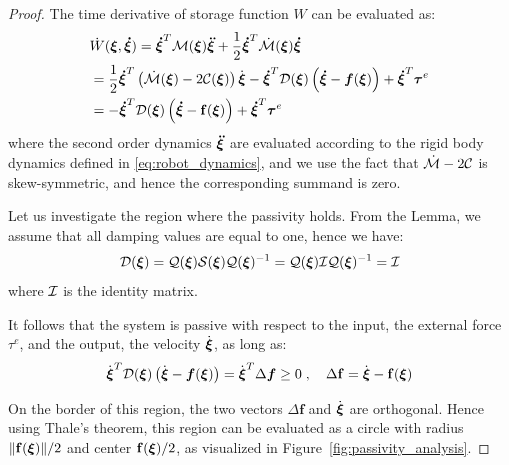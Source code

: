 \begin{proof}
The time derivative of storage function $W$ can be evaluated as:
\begin{align}
	& \dot W(\boldsymbol{\xi}, \boldsymbol{\dot \xi}) =
    \boldsymbol{\dot \xi}^T \mathcal{M}(\boldsymbol{\xi}) \boldsymbol{\ddot \xi}  + \frac{1}{2} \boldsymbol{\dot \xi}^T \dot{\mathcal{M}}(\boldsymbol{\xi}) \boldsymbol{\dot \xi}  \nonumber \\
  &= \frac{1}{2} \boldsymbol{\dot \xi}^T \left( \dot{\mathcal{M}}(\boldsymbol{\xi}) - 2 \mathcal{C}(\boldsymbol{\xi}) \right) \dot{\boldsymbol{\xi}} - \boldsymbol{\dot \xi}^T \mathcal{D}(\boldsymbol{\xi}) \left(\boldsymbol{\dot \xi} - \boldsymbol{f}(\boldsymbol{\xi}) \right) + \boldsymbol{\dot \xi}^T \boldsymbol{\tau}^e \nonumber \\
  &= - \boldsymbol{\dot \xi}^T \mathcal{D}(\boldsymbol{\xi}) \left( \boldsymbol{\dot\xi} - \mathbf{f}(\boldsymbol{\xi}) \right) + \boldsymbol{\dot\xi}^T \boldsymbol{\tau}^e
\end{align}
where the second order dynamics $\boldsymbol{\ddot \xi}$ are evaluated according to the rigid body dynamics defined in \eqref{eq:robot_dynamics}, and we use the fact that $\dot{\mathcal{M}} - 2 \mathcal{C}$ is skew-symmetric, and hence the corresponding summand is zero.

Let us investigate the region where the passivity holds. From the Lemma, we assume that all damping values are equal to one, hence we have:
\begin{equation}
	\mathcal{D}({\boldsymbol{\xi}}) = \mathcal{Q}({\boldsymbol{\xi}}) \mathcal{S} ({\boldsymbol{\xi}}) \mathcal{Q}({\boldsymbol{\xi}})^{-1}= \mathcal{Q}({\boldsymbol{\xi}}) \mathcal{I} \mathcal{Q}({\boldsymbol{\xi}})^{-1} = \mathcal{I}
\end{equation}
where $\mathcal{I}$ is the identity matrix.

It follows that the system is passive with respect to the input, the external force $\tau^e$, and the output, the velocity $\dot {\boldsymbol{\xi}}$, as long as:
\begin{equation}
	\dot{\boldsymbol {\boldsymbol{\xi}}}^T \mathcal{D}({\boldsymbol{\xi}}) \left(\dot{\boldsymbol {\boldsymbol{\xi}}} - \boldsymbol{f}(\boldsymbol {\boldsymbol{\xi}}) \right) = 
    \dot{{\boldsymbol{\xi}}} ^ T \Delta \boldsymbol{f}  \geq 0 
 \; , \quad
 \Delta \mathbf{f} = \dot{{\boldsymbol{\xi}}} - \mathbf{f}({\boldsymbol{\xi}})
\end{equation}

On the border of this region, the two vectors $\Delta \mathbf{f}$ and $\dot{\mathbf {\boldsymbol{\xi}}}$ are orthogonal.
Hence using Thale's theorem, this region can be evaluated as a circle with radius $\| \mathbf{f} ({\boldsymbol{\xi}}) \| / 2$ and center $\mathbf{f}(\mathbf {\boldsymbol{\xi}}) / 2$, as visualized in Figure~\ref{fig:passivity_analysis}.


\end{proof}
